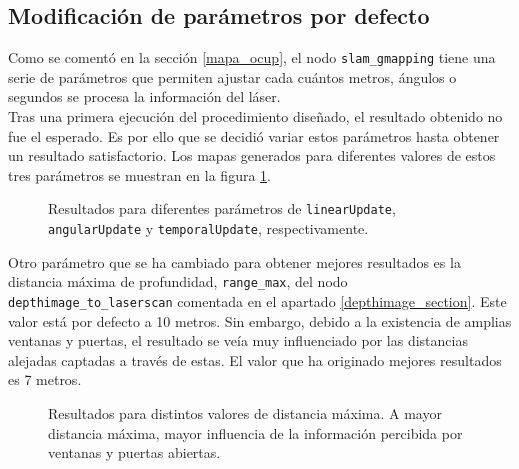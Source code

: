 \subsection{Modificación de parámetros por defecto}

Como se comentó en la sección \ref{mapa_ocup}, el nodo \texttt{slam\_gmapping} tiene una serie de parámetros que permiten ajustar cada cuántos metros, ángulos o segundos se procesa la información del láser.\\

Tras una primera ejecución del procedimiento diseñado, el resultado obtenido no fue el esperado. Es por ello que se decidió variar estos parámetros hasta obtener un resultado satisfactorio. Los mapas generados para diferentes valores de estos tres parámetros se muestran en la figura \ref{fig:scans_params}.\\

\begin{figure}[H]
 \centering
 \caption{Resultados para diferentes parámetros de \texttt{linearUpdate}, \texttt{angularUpdate} y \texttt{temporalUpdate}, respectivamente.}
 \label{fig:scans_params}
\end{figure}

Otro parámetro que se ha cambiado para obtener mejores resultados es la distancia máxima de profundidad, \texttt{range\_max}, del nodo \texttt{depthimage\_to\_laserscan} comentada en el apartado \ref{depthimage_section}. Este valor está por defecto a 10 metros. Sin embargo, debido a la existencia de amplias ventanas y puertas, el resultado se veía muy influenciado por las distancias alejadas captadas a través de estas. El valor que ha originado mejores resultados es 7 metros.\\

\begin{figure}[H]
 \centering
 \caption{Resultados para distintos valores de distancia máxima. A mayor distancia máxima, mayor influencia de la información percibida por ventanas y puertas abiertas.}
 \label{fig:scans_range}
\end{figure}



